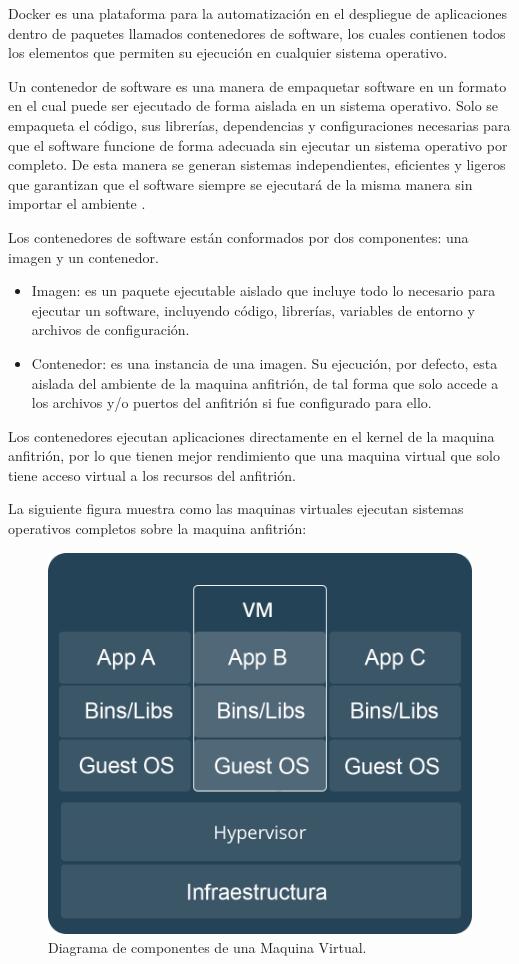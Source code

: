 Docker es una plataforma para la automatización en el despliegue de aplicaciones dentro de paquetes llamados contenedores de software,
los cuales contienen todos los elementos que permiten su ejecución en cualquier sistema operativo.

Un contenedor de software es una manera de empaquetar software en un formato en el cual puede ser ejecutado de forma aislada en un sistema
operativo. Solo se empaqueta el código, sus librerías, dependencias y configuraciones necesarias para que el
software funcione de forma adecuada sin ejecutar un sistema operativo por completo.
De esta manera se generan sistemas independientes, eficientes y ligeros que garantizan
que el software siempre se ejecutará de la misma manera sin importar el ambiente \cite{21}.

Los contenedores de software están conformados por dos componentes: una imagen y un contenedor.

\begin{itemize}
\item Imagen: es un paquete ejecutable aislado que incluye todo lo necesario para ejecutar un software, incluyendo código,
librerías, variables de entorno y archivos de configuración.

\item Contenedor: es una instancia de una imagen. Su ejecución, por defecto, esta aislada del ambiente de la maquina anfitrión,
de tal forma que solo accede a los archivos y/o puertos del anfitrión si fue configurado para ello.
\end{itemize}

Los contenedores ejecutan aplicaciones directamente en el kernel de la maquina anfitrión, por lo que tienen mejor
rendimiento que una maquina virtual que solo tiene acceso virtual a los recursos del anfitrión.


La siguiente figura muestra como las maquinas virtuales ejecutan sistemas operativos completos sobre la maquina anfitrión:

\begin{figure}[H]
	\centering
		\includegraphics[width=.9\textwidth]{figures/docker_vm}
	\caption{Diagrama de componentes de una Maquina Virtual.}
	\label{fig:docker_vm}
\end{figure}

